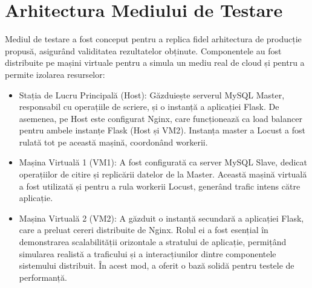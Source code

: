 \documentclass[12pt, a4paper, oneside, romanian]{teza-upb}
\begin{document}
\section{Arhitectura Mediului de Testare}
Mediul de testare a fost conceput pentru a replica fidel arhitectura de producție propusă, asigurând validitatea rezultatelor obținute. Componentele au fost distribuite pe mașini virtuale pentru a simula un mediu real de cloud și pentru a permite izolarea resurselor:
\begin{itemize}
	\item Stația de Lucru Principală (Host): Găzduiește serverul MySQL Master, responsabil cu operațiile de scriere, și o instanță a aplicației Flask. De asemenea, pe Host este configurat Nginx, care funcționează ca load balancer pentru ambele instanțe Flask (Host și VM2). Instanța master a Locust a fost rulată tot pe această mașină, coordonând workerii.
	\item Mașina Virtuală 1 (VM1): A fost configurată ca server MySQL Slave, dedicat operațiilor de citire și replicării datelor de la Master. Această mașină virtuală a fost utilizată și pentru a rula workerii Locust, generând trafic intens către aplicație.
	\item Mașina Virtuală 2 (VM2):  A găzduit o instanță secundară a aplicației Flask, care a preluat cereri distribuite de Nginx. Rolul ei a fost esențial în demonstrarea scalabilității orizontale a stratului de aplicație, permițând simularea realistă a traficului și a interacțiunilor dintre componentele sistemului distribuit. În acest mod, a oferit o bază solidă pentru testele de performanță.  


\end{itemize}
\end{document}
